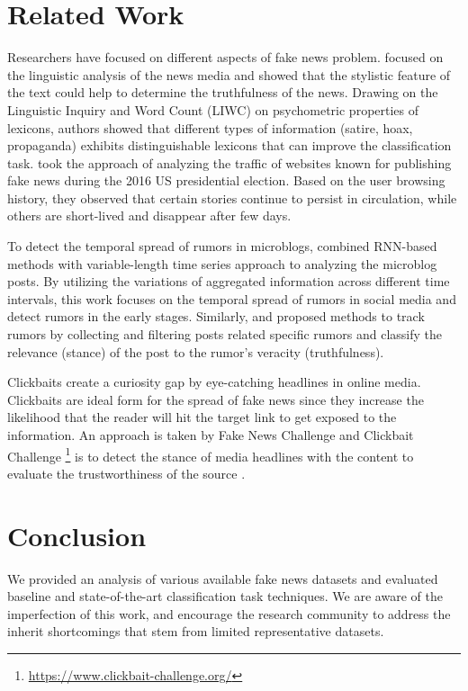 \section{Related Work}
Researchers have focused on different aspects of fake news problem. \citet{Rashkin2017TruthOV} focused on the linguistic analysis of the news media and showed that the stylistic feature of the text could help to determine the truthfulness of the news. Drawing on the Linguistic Inquiry and Word Count (LIWC) \cite{Pennebaker}  on psychometric properties of lexicons, authors showed that different types of information (satire, hoax, propaganda) exhibits distinguishable lexicons that can improve the classification task. \citet{fourney_cikm2017} took the approach of analyzing the traffic of websites known for publishing fake news during the 2016 US presidential election. Based on the user browsing history, they observed that certain stories continue to persist in circulation, while others are short-lived and disappear after few days. 

To detect the temporal spread of rumors in microblogs, \citet{Ma2016DetectingRF} combined RNN-based methods with variable-length time series approach to analyzing the microblog posts. By utilizing the variations of aggregated information across different time intervals, this work focuses on the temporal spread of rumors in social media and detect rumors in the early stages. Similarly, \citet{Wu_rumors} and \citet{Sampson:2016:LIS:2983323.2983697} proposed methods to track rumors by collecting and filtering posts related specific rumors and classify the relevance (stance) of the post to the rumor's veracity (truthfulness). 

Clickbaits create a curiosity gap by eye-catching headlines in online media. Clickbaits are ideal form for the spread of fake news since they increase the likelihood that the reader will hit the target link to get exposed to the information. An approach is taken by Fake News Challenge and Clickbait Challenge \footnote{\url{https://www.clickbait-challenge.org/}} is to detect the stance of media headlines with the content to evaluate the trustworthiness of the source \cite{RiedelASR17, Cao2017MachineLB, Zeng2017NeuralSD}.

\section{Conclusion}
We provided an analysis of various available fake news datasets and evaluated baseline and state-of-the-art classification task techniques. We are aware of the imperfection of this work, and encourage the research community to address the inherit shortcomings that stem from limited representative datasets.    
